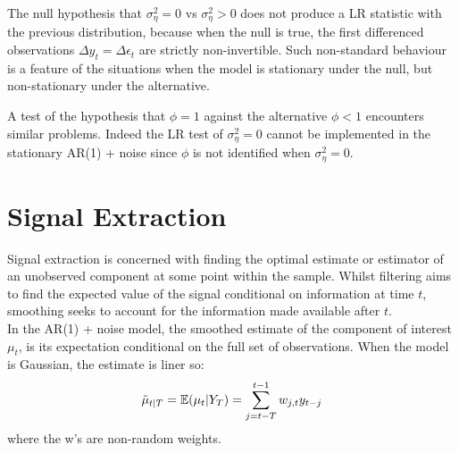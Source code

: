 \documentclass[DIV=14,titlepage=false]{scrreprt}
\begin{document}
The null hypothesis that $\sigma^2_\eta = 0$  vs $\sigma^2_\eta > 0$ does not produce a LR statistic with the previous distribution, because when the null is true, the first differenced observations $\Delta y_t = \Delta \epsilon_t$ are strictly non-invertible. Such non-standard behaviour is a feature of the situations when the model is stationary under the null, but non-stationary under the alternative.
\begin{note}
    A test of the hypothesis that $\phi = 1$ against the alternative $\phi < 1$  encounters similar problems. Indeed the LR test of $\sigma^2_\eta = 0$ cannot be implemented in the stationary AR(1) + noise since $\phi$ is not identified when $\sigma^2_\eta = 0$.
\end{note}
\section{Signal Extraction}
Signal extraction is concerned with finding the optimal estimate or estimator of an unobserved component at some point within the sample. Whilst filtering aims to find the expected value of the signal conditional on information at time $t$, smoothing seeks to account for the information made available after $t$.\\
In the AR(1) + noise model, the smoothed estimate of the component of interest $\mu_t$, is its expectation conditional on the full set of observations. When the model is Gaussian, the estimate is liner so:
\[
    \tilde \mu_{t|T} = \mathbb{E}(\mu_t|Y_T) = \sum_{j=t-T}^{t-1} w_{j,t} y_{t-j}
\]
where the w's are non-random weights. 
\end{document}
